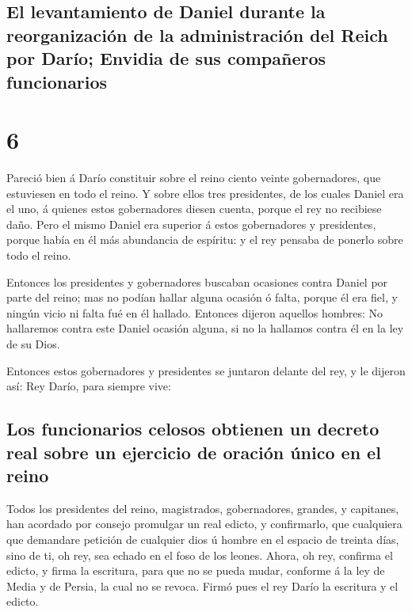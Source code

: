 \hypertarget{el-levantamiento-de-daniel-durante-la-reorganizaciuxf3n-de-la-administraciuxf3n-del-reich-por-daruxedo-envidia-de-sus-compauxf1eros-funcionarios}{%
\subsection{El levantamiento de Daniel durante la reorganización de la
administración del Reich por Darío; Envidia de sus compañeros
funcionarios}\label{el-levantamiento-de-daniel-durante-la-reorganizaciuxf3n-de-la-administraciuxf3n-del-reich-por-daruxedo-envidia-de-sus-compauxf1eros-funcionarios}}

\hypertarget{section-5}{%
\section{6}\label{section-5}}

 Pareció bien á Darío constituir sobre el reino ciento
veinte gobernadores, que estuviesen en todo el reino.  Y
sobre ellos tres presidentes, de los cuales Daniel era el uno, á quienes
estos gobernadores diesen cuenta, porque el rey no recibiese daño.
 Pero el mismo Daniel era superior á estos gobernadores y
presidentes, porque había en él más abundancia de espíritu: y el rey
pensaba de ponerlo sobre todo el reino.

 Entonces los presidentes y gobernadores buscaban ocasiones
contra Daniel por parte del reino; mas no podían hallar alguna ocasión ó
falta, porque él era fiel, y ningún vicio ni falta fué en él hallado.
 Entonces dijeron aquellos hombres: No hallaremos contra
este Daniel ocasión alguna, si no la hallamos contra él en la ley de su
Dios.

 Entonces estos gobernadores y presidentes se juntaron
delante del rey, y le dijeron así: Rey Darío, para siempre vive:

\hypertarget{los-funcionarios-celosos-obtienen-un-decreto-real-sobre-un-ejercicio-de-oraciuxf3n-uxfanico-en-el-reino}{%
\subsection{Los funcionarios celosos obtienen un decreto real sobre un
ejercicio de oración único en el
reino}\label{los-funcionarios-celosos-obtienen-un-decreto-real-sobre-un-ejercicio-de-oraciuxf3n-uxfanico-en-el-reino}}

 Todos los presidentes del reino, magistrados, gobernadores,
grandes, y capitanes, han acordado por consejo promulgar un real edicto,
y confirmarlo, que cualquiera que demandare petición de cualquier dios ú
hombre en el espacio de treinta días, sino de ti, oh rey, sea echado en
el foso de los leones.  Ahora, oh rey, confirma el edicto, y
firma la escritura, para que no se pueda mudar, conforme á la ley de
Media y de Persia, la cual no se revoca.  Firmó pues el rey
Darío la escritura y el edicto.

